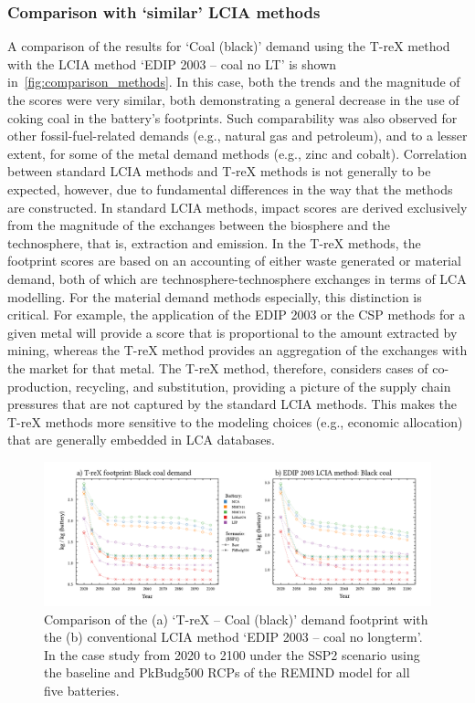 \documentclass[a4paper,fleqn]{cas-dc}
\begin{document}
\subsubsection{Comparison with `similar' LCIA methods}\label{sec:results-case_study-methodcomparison}

A comparison of the results for `Coal (black)' demand using the T-reX method
with the LCIA method `EDIP 2003 – coal no LT' is shown
in~\autoref{fig:comparison_methods}. In this case, both the trends and the
magnitude of the scores were very similar, both demonstrating a general
decrease in the use of coking coal in the battery's footprints. Such
comparability was also observed for other fossil-fuel-related demands (e.g.,
natural gas and petroleum), and to a lesser extent, for some of the metal
demand methods (e.g., zinc and cobalt). Correlation between standard LCIA
methods and T-reX methods is not generally to be expected, however, due to
fundamental differences in the way that the methods are constructed. In
standard LCIA methods, impact scores are derived exclusively from the magnitude
of the exchanges between the biosphere and the technosphere, that is,
extraction and emission. In the T-reX methods, the footprint scores are based
on an accounting of either waste generated or material demand, both of which
are technosphere-technosphere exchanges in terms of LCA modelling. For the
material demand methods especially, this distinction is critical. For example,
the application of the EDIP 2003 or the CSP methods for a given metal will
provide a score that is proportional to the amount extracted by mining, whereas
the T-reX method provides an aggregation of the exchanges with the market for
that metal. The T-reX method, therefore, considers cases of co-production,
recycling, and substitution, providing a picture of the supply chain pressures
that are not captured by the standard LCIA methods. This makes the T-reX
methods more sensitive to the modeling choices (e.g., economic allocation) that
are generally embedded in LCA databases.

\begin{figure}
	\centering
	\includegraphics[width=1.9\columnwidth]{figures/T-reX-coalANDedip.pdf}
	\caption{Comparison of the (a) `T-reX – Coal (black)' demand footprint with the (b) conventional LCIA method `EDIP 2003 – coal no longterm'. In the case study from 2020 to 2100 under the SSP2 scenario using the baseline and PkBudg500 RCPs of the REMIND model for all five batteries.}\label{fig:comparison_methods}
\end{figure}
\end{document}
